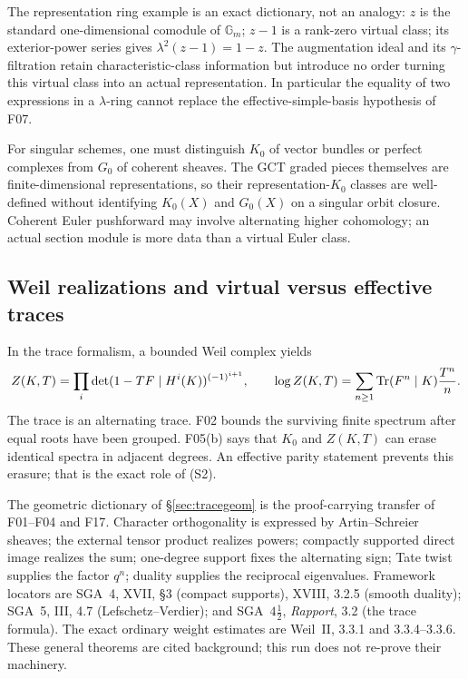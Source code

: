 \documentclass[11pt,a4paper]{article}
\newcommand{\fid}[1]{\textsf{#1}}\newcommand{\gate}[1]{\textsf{#1}}
\theoremstyle{named}\newtheorem{finding}{Finding}[section]
\theoremstyle{definition}\newtheorem{definition}[finding]{Definition}
\theoremstyle{remark}\newtheorem{remark}[finding]{Remark}
\begin{document}
The representation ring example is an exact dictionary, not an analogy: $z$ is the standard one-dimensional comodule of $\mathbb G_m$; $z-1$ is a rank-zero virtual class; its exterior-power series gives $\lambda^2(z-1)=1-z$. The augmentation ideal and its $\gamma$-filtration retain characteristic-class information but introduce no order turning this virtual class into an actual representation. In particular the equality of two expressions in a $\lambda$-ring cannot replace the effective-simple-basis hypothesis of \fid{F07}.

For singular schemes, one must distinguish $K_0$ of vector bundles or perfect complexes from $G_0$ of coherent sheaves. The GCT graded pieces themselves are finite-dimensional representations, so their representation-$K_0$ classes are well-defined without identifying $K_0(X)$ and $G_0(X)$ on a singular orbit closure. Coherent Euler pushforward may involve alternating higher cohomology; an actual section module is more data than a virtual Euler class.

\subsection{Weil realizations and virtual versus effective traces}
In the trace formalism, a bounded Weil complex yields
\[
 Z(K,T)=\prod_i\det(1-TF\mid H^i(K))^{(-1)^{i+1}},\qquad
 \log Z(K,T)=\sum_{n\ge1}\operatorname{Tr}(F^n\mid K)\frac{T^n}{n}.
\]
The trace is an alternating trace. \fid{F02} bounds the surviving finite spectrum after equal roots have been grouped. \fid{F05}(b) says that $K_0$ and $Z(K,T)$ can erase identical spectra in adjacent degrees. An effective parity statement prevents this erasure; that is the exact role of (S2).

The geometric dictionary of \S\ref{sec:tracegeom} is the proof-carrying transfer of \fid{F01}--\fid{F04} and \fid{F17}. Character orthogonality is expressed by Artin--Schreier sheaves; the external tensor product realizes powers; compactly supported direct image realizes the sum; one-degree support fixes the alternating sign; Tate twist supplies the factor $q^n$; duality supplies the reciprocal eigenvalues. Framework locators are SGA~4, XVII, \S3 (compact supports), XVIII, 3.2.5 (smooth duality); SGA~5, III, 4.7 (Lefschetz--Verdier); and SGA~$4\frac12$, \emph{Rapport}, 3.2 (the trace formula). The exact ordinary weight estimates are Weil~II, 3.3.1 and 3.3.4--3.3.6. These general theorems are cited background; this run does not re-prove their machinery.
\end{document}
